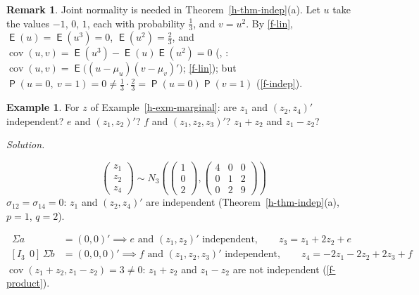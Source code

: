 \documentclass[12pt]{article}
\DeclareMathOperator\prb{\mathsf{P}}
\DeclareMathOperator\expc{\mathsf{E}}
\DeclareMathOperator\cov{cov}
\theoremstyle{definition}
\newtheorem{example}[theorem]{Example}
\newtheorem{remark}[theorem]{Remark}
\newcommand{\boardtop}{\vspace*{-\abovedisplayskip}}
\begin{document}
\begin{remark}\label{h-rem-uncorr}
Joint normality is needed in Theorem~\ref{h-thm-indep}(a). Let \(u\) take the values \(-1\), \(0\), \(1\), each with
probability \(\frac13\), and \(v=u^2\). By \ref{f-lin}, \(\expc(u)=\expc(u^3)=0\), \(\expc(u^2)=\frac23\), and
\(\cov(u,v)=\expc(u^3)-\expc(u)\expc(u^2)=0\) (, : \(\cov(u,v)=\expc\bigl((u-\mu_u)(v-\mu_v)'\bigr)\);
\ref{f-lin}); but \(\prb(u=0,\ v=1)=0\ne\frac13\cdot\frac23=\prb(u=0)\prb(v=1)\) (\ref{f-indep}).
\end{remark}

\begin{example}\label{h-exm-indep}
For \(z\) of Example~\ref{h-exm-marginal}: are \(z_1\) and \((z_2,z_4)'\) independent? \(e\) and \((z_1,z_2)'\)? \(f\)
and \((z_1,z_2,z_3)'\)? \(z_1+z_2\) and \(z_1-z_2\)?
\end{example}
\textit{Solution.}
\begin{board}[Corollary~\ref{h-cor-marginal}(a) with \(i_1,i_2,i_3=1,2,4\):]
\[
\begin{pmatrix}z_1\\z_2\\z_4\end{pmatrix}\sim
N_3\left(\begin{pmatrix}1\\0\\2\end{pmatrix},\begin{pmatrix}4&0&0\\0&1&2\\0&2&9\end{pmatrix}\right)
\]
\(\sigma_{12}=\sigma_{14}=0\): \(z_1\) and \((z_2,z_4)'\) are independent (Theorem~\ref{h-thm-indep}(a), \(p=1\),
\(q=2\)).
\end{board}
\begin{board}[Theorem~\ref{h-thm-indep}(c) with \(B=a'\), \(B=b'\); \(\Sigma a=(0,0,1,2)'\), \(\Sigma b=(0,0,0,1)'\)
(\lec{9}, \lit{Example~5}):]
\boardtop
\begin{align*}
[I_2\ \ 0]\,\Sigma a&=(0,0)'\implies e\text{ and }(z_1,z_2)'\text{ independent},\qquad z_3=z_1+2z_2+e\\
[I_3\ \ 0]\,\Sigma b&=(0,0,0)'\implies f\text{ and }(z_1,z_2,z_3)'\text{ independent},\qquad z_4=-2z_1-2z_2+2z_3+f
\end{align*}
\(\cov(z_1+z_2,z_1-z_2)=3\ne0\): \(z_1+z_2\) and \(z_1-z_2\) are not independent (\ref{f-product}).
\end{board}
\end{document}
